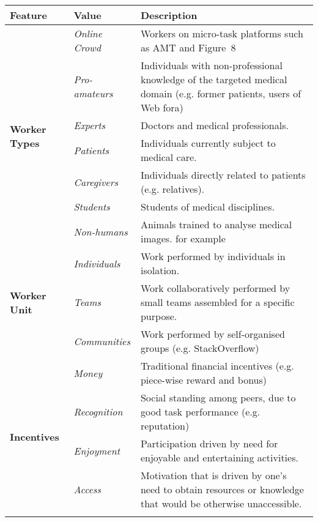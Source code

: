 \documentclass[10pt,twocolumn,letterpaper]{article}
\begin{document}
\begin{table*}
    \small
    \centering
    \begin{tabular}{lm{75px}m{320px}}
    \toprule
		\textbf{Feature} & \textbf{Value} & \textbf{Description} \\ \midrule
		\multirow{7}{*}{\textbf{Worker Types}}	& \textit{Online Crowd} & Workers on micro-task platforms such as AMT and Figure~8 \\ \cline{2-3}
									 	& \textit{Pro-amateurs} & Individuals with non-professional knowledge of the targeted medical domain (e.g. former patients, users of Web fora) \\	\cline{2-3}
									 	& \textit{Experts} & Doctors and medical professionals. \\	\cline{2-3}																& \textit{Patients} & Individuals currently subject to medical care. \\	\cline{2-3}	
									 	& \textit{Caregivers} & Individuals directly related to patients (e.g. relatives).\\ \cline{2-3}		
									 	& \textit{Students} & Students of medical disciplines. \\	\cline{2-3}																& \textit{Non-humans} & Animals trained to analyse medical images. for example \cite{levenson2015pigeons}  \\
		\midrule
		\multirow{3}{*}{\textbf{Worker Unit}}		& \textit{Individuals} & Work performed by individuals in isolation. \\ \cline{2-3}
									 	& \textit{Teams} & Work collaboratively performed by small teams assembled for a specific purpose. \\	\cline{2-3}
									 	& \textit{Communities} & Work performed by self-organised groups (e.g. StackOverflow)  \\
		\midrule
		\multirow{8}{*}{\textbf{Incentives}}		& \textit{Money} & Traditional financial incentives (e.g. piece-wise reward and bonus) \\ \cline{2-3}
									 	& \textit{Recognition} & Social standing among peers, due to good task performance (e.g. reputation) \\	\cline{2-3}
									 	& \textit{Enjoyment} &   Participation driven by need for enjoyable and entertaining activities.\\	\cline{2-3}																& \textit{Access} & Motivation that is driven by one's need to obtain resources or knowledge that would be otherwise unaccessible.\\	\cline{2-3}	

\end{tabular}
\end{table*}
\end{document}
